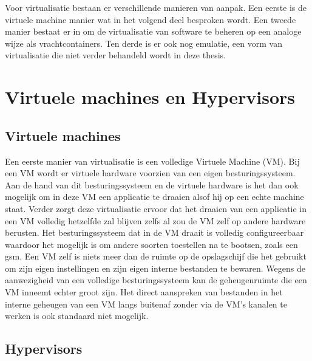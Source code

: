 Voor virtualisatie bestaan er verschillende manieren van aanpak. Een eerste is de virtuele machine manier wat in het volgend deel besproken wordt. Een tweede manier bestaat er in om de virtualisatie van software te beheren op een analoge wijze als vrachtcontainers. Ten derde is er ook nog emulatie, een vorm van virtualisatie die niet verder behandeld wordt in deze thesis.

\section{Virtuele machines en Hypervisors}

\subsection{Virtuele machines}
Een eerste manier van virtualisatie is een volledige Virtuele Machine (VM). Bij een VM wordt er virtuele hardware voorzien van een eigen besturingssysteem. Aan de hand van dit besturingssysteem en de virtuele hardware is het dan ook mogelijk om in deze VM een applicatie te draaien alsof hij op een echte machine staat. Verder zorgt deze virtualisatie ervoor dat het draaien van een applicatie in een VM volledig hetzelfde zal blijven zelfs al zou de VM zelf op andere hardware berusten. Het besturingssysteem dat in de VM draait is volledig configureerbaar waardoor het mogelijk is om andere soorten toestellen na te bootsen, zoals een gsm. Een VM zelf is niets meer dan de ruimte op de opslagschijf die het gebruikt om zijn eigen instellingen en zijn eigen interne bestanden te bewaren. Wegens de aanwezigheid van een volledige besturingssysteem kan de geheugenruimte die een VM inneemt echter groot zijn. Het direct aanspreken van bestanden in het interne geheugen van een VM langs buitenaf zonder via de VM’s kanalen te werken is ook standaard niet mogelijk\autocite{Eder2016}.

\subsection{Hypervisors}

